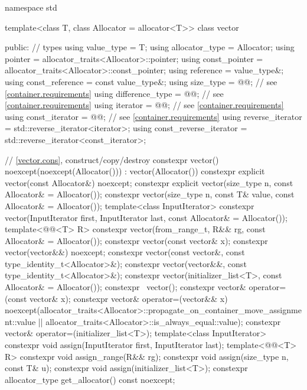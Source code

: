 \begin{codeblock}
namespace std {
  template<class T, class Allocator = allocator<T>>
  class vector {
  public:
    // types
    using value_type             = T;
    using allocator_type         = Allocator;
    using pointer                = allocator_traits<Allocator>::pointer;
    using const_pointer          = allocator_traits<Allocator>::const_pointer;
    using reference              = value_type&;
    using const_reference        = const value_type&;
    using size_type              = @@; // see \ref{container.requirements}
    using difference_type        = @@; // see \ref{container.requirements}
    using iterator               = @@; // see \ref{container.requirements}
    using const_iterator         = @@; // see \ref{container.requirements}
    using reverse_iterator       = std::reverse_iterator<iterator>;
    using const_reverse_iterator = std::reverse_iterator<const_iterator>;

    // \ref{vector.cons}, construct/copy/destroy
    constexpr vector() noexcept(noexcept(Allocator())) : vector(Allocator()) { }
    constexpr explicit vector(const Allocator&) noexcept;
    constexpr explicit vector(size_type n, const Allocator& = Allocator());
    constexpr vector(size_type n, const T& value, const Allocator& = Allocator());
    template<class InputIterator>
      constexpr vector(InputIterator first, InputIterator last, const Allocator& = Allocator());
    template<@@<T> R>
      constexpr vector(from_range_t, R&& rg, const Allocator& = Allocator());
    constexpr vector(const vector& x);
    constexpr vector(vector&&) noexcept;
    constexpr vector(const vector&, const type_identity_t<Allocator>&);
    constexpr vector(vector&&, const type_identity_t<Allocator>&);
    constexpr vector(initializer_list<T>, const Allocator& = Allocator());
    constexpr ~vector();
    constexpr vector& operator=(const vector& x);
    constexpr vector& operator=(vector&& x)
      noexcept(allocator_traits<Allocator>::propagate_on_container_move_assignment::value ||
               allocator_traits<Allocator>::is_always_equal::value);
    constexpr vector& operator=(initializer_list<T>);
    template<class InputIterator>
      constexpr void assign(InputIterator first, InputIterator last);
    template<@@<T> R>
      constexpr void assign_range(R&& rg);
    constexpr void assign(size_type n, const T& u);
    constexpr void assign(initializer_list<T>);
    constexpr allocator_type get_allocator() const noexcept;

}}
\end{codeblock}
